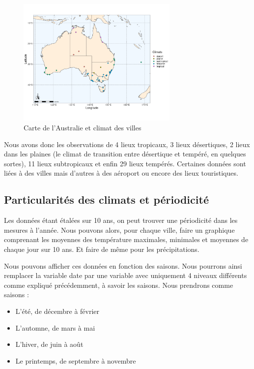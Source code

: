 \documentclass{article}
\begin{document}
\begin{figure}[H]
    \centering
    \includegraphics[width=0.7\textwidth]{Images/Cartographie/Australia_climates.png}
    \caption{Carte de l'Australie et climat des villes}
\end{figure}

Nous avons donc les observations de 4 lieux tropicaux, 3 lieux désertiques, 2 lieux dans les plaines (le climat de transition entre désertique et tempéré, en quelques sortes), 11 lieux subtropicaux et enfin 29 lieux tempérés. Certaines données sont liées à des villes mais d'autres à des aéroport ou encore des lieux touristiques.

\subsection{Particularités des climats et périodicité}

Les données étant étalées sur 10 ans, on peut trouver une périodicité dans les mesures à l'année. Nous pouvons alors, pour chaque ville, faire un graphique comprenant les moyennes des température maximales, minimales et moyennes de chaque jour sur 10 ans. Et faire de même pour les précipitations. 

Nous pouvons afficher ces données en fonction des saisons. Nous pourrons ainsi remplacer la variable date par une variable avec uniquement 4 niveaux différents comme expliqué précédemment, à savoir les saisons. Nous prendrons comme saisons : 

\begin{itemize}
    \item L’été, de décembre à février
    \item L’automne, de mars à mai
    \item L’hiver, de juin à août
    \item Le printemps, de septembre à novembre
\end{itemize}
\end{document}

